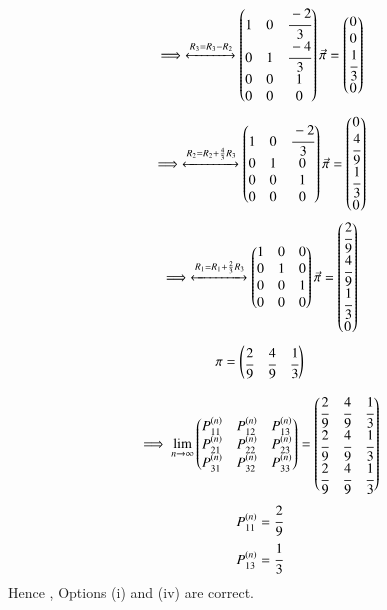 \begin{enumerate}
\begin{multline}
\\
    \implies\xleftrightarrow{R_{3}=R_{3}-R_{2}}\begin{pmatrix}1&0&\cfrac{-2}{3}\\0&1&\cfrac{-4}{3}\\0&0&1\\0&0&0\end{pmatrix}\Vec{\pi}=\begin{pmatrix}0\\0\\\cfrac{1}{3}\\0\end{pmatrix}
\end{multline}
\begin{multline}
    \implies\xleftrightarrow{R_{2}=R_{2}+\frac{4}{3}R_{3}}\begin{pmatrix}1&0&\cfrac{-2}{3}\\0&1&0\\0&0&1\\0&0&0\end{pmatrix}\Vec{\pi}=\begin{pmatrix}0\\\cfrac{4}{9}\\\cfrac{1}{3}\\0\end{pmatrix}
\\
    \implies\xleftrightarrow{R_{1}=R_{1}+\frac{2}{3}R_{3}}\begin{pmatrix}1&0&0\\0&1&0\\0&0&1\\0&0&0\end{pmatrix}\Vec{\pi}=\begin{pmatrix}\cfrac{2}{9}\\\cfrac{4}{9}\\\cfrac{1}{3}\\0\end{pmatrix}
\end{multline}
\begin{align}
    \pi = \begin{pmatrix}\cfrac{2}{9}&\cfrac{4}{9}&\cfrac{1}{3}\end{pmatrix}
\end{align}

\begin{align}
    \implies \lim_{n\to\infty}\begin{pmatrix}P_{11}^{(n)}&P_{12}^{(n)}&P_{13}^{(n)}\\P_{21}^{(n)}&P_{22}^{(n)}&P_{23}^{(n)}\\P_{31}^{(n)}&P_{32}^{(n)}&P_{33}^{(n)}\end{pmatrix} = \begin{pmatrix}\cfrac{2}{9}&\cfrac{4}{9}&\cfrac{1}{3}\\\cfrac{2}{9}&\cfrac{4}{9}&\cfrac{1}{3}\\\cfrac{2}{9}&\cfrac{4}{9}&\cfrac{1}{3} \end{pmatrix}
\end{align}
\begin{align}
    P_{11}^{(n)}=\cfrac{2}{9}
\\
    P_{13}^{(n)}=\cfrac{1}{3}
\end{align}
Hence , Options (i) and (iv) are correct.

\end{enumerate}




